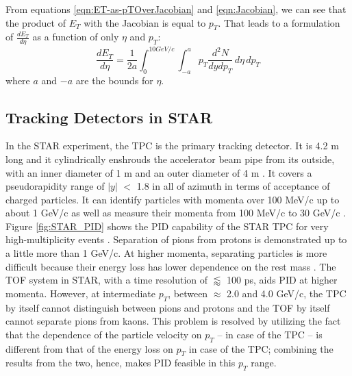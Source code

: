 From equations \ref{eqn:ET-as-pTOverJacobian} and \ref{eqn:Jacobian}, we can see that the product of $E_{T}$ with the Jacobian is equal to $p_{T}$. That leads to a formulation of $\frac{dE_{T}}{d\eta}$ as a function of only $\eta$ and $p_{T}$:
\begin{equation}\label{eqn:dETOverdEta}
\frac{dE_{T}}{d\eta} = \frac{1}{2a}\int_{0}^{10GeV/c}\int_{-a}^{a} p_{T}\frac{d^{2}N}{dydp_{T}} \,d\eta\,dp_{T}
\end{equation}
where $a$ and $-a$ are the bounds for $\eta$.


\subsection{Tracking Detectors in STAR}\label{subsec:tracking_STAR}
In the STAR experiment, the TPC is the primary tracking detector. It is 4.2 m long and it cylindrically enshrouds the accelerator beam pipe from its outside, with an inner diameter of 1 m and an outer diameter of 4 m \cite{phdthesisnattrass}. It covers a pseudorapidity range of $|y|$ $<$ 1.8 in all of azimuth in terms of acceptance of charged particles. It can identify particles with momenta over 100 MeV/c up to about 1 GeV/c as well as measure their momenta from 100 MeV/c to 30 GeV/c \cite{Anderson:2003ur}. Figure \ref{fig:STAR_PID} shows the PID capability of the STAR TPC for very high-multiplicity events \cite{0034-4885-73-11-116201}. Separation of pions from protons is demonstrated up to a little more than 1 GeV/c. At higher momenta, separating particles is more difficult because their energy loss has lower dependence on the rest mass \cite{Anderson:2003ur}. The TOF system in STAR, with a time resolution of $\lessapprox$ 100 ps, aids PID at higher momenta. However, at intermediate $p_{T}$, between $\approx$ 2.0 and 4.0 GeV/c, the TPC by itself cannot distinguish between pions and protons and the TOF by itself cannot separate pions from kaons. This problem is resolved by utilizing the fact that the dependence of the particle velocity on $p_{T}$ -- in case of the TPC -- is different from that of the energy loss on $p_{T}$ in case of the TPC; combining the results from the two, hence, makes PID feasible in this $p_{T}$ range. \cite{Shao:2005iu}
